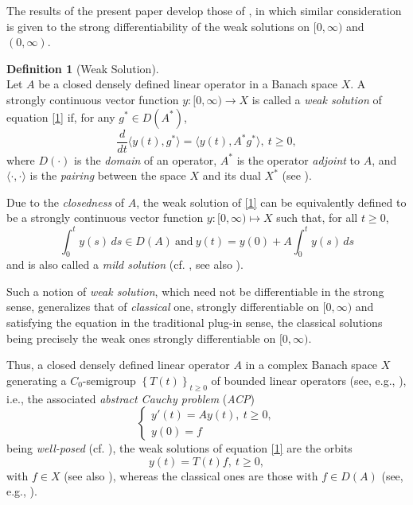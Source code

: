 \documentclass{amsart}
\theoremstyle{plain}
\theoremstyle{definition}
\newtheorem{defn}{Definition}[section]
\begin{document}
The results of the present paper develop those of \cite{Markin2011}, in which similar consideration is given to the strong differentiability of the weak solutions on $[0,\infty)$ and $(0,\infty)$.

\begin{defn}[Weak Solution]\label{ws}\ \\
Let $A$ be a closed densely defined linear operator in a Banach space $X$. A strongly continuous vector function $y:[0,\infty)\rightarrow X$ is called a {\it weak solution} of equation \eqref{1} if, for any $g^* \in D(A^*)$,
\begin{equation*}
\dfrac{d}{dt}\langle y(t),g^*\rangle = \langle y(t),A^*g^* \rangle,\ t\ge 0,
\end{equation*}
where $D(\cdot)$ is the \textit{domain} of an operator, $A^*$ is the operator {\it adjoint} to $A$, and $\langle\cdot,\cdot\rangle$ is the {\it pairing} between
the space $X$ and its dual $X^*$ (see \cite{Ball}).
\end{defn}

Due to the \textit{closedness} of $A$, the weak solution of \eqref{1} can be equivalently defined to be a strongly continuous vector function $y:[0,\infty)\mapsto X$ such that, for all $t\ge 0$,
\begin{equation*}
\int_0^ty(s)\,ds\in D(A)\ \text{and} \ y(t)=y(0)+A\int_0^ty(s)\,ds
\end{equation*}
and is also called a \textit{mild solution} (cf. {\cite[Ch. II, Definition 6.3]{Engel-Nagel}}, see also {\cite[Preliminaries]{Markin2017(2)}}).

Such a notion of \textit{weak solution}, which need not be differentiable in the strong sense, generalizes that of \textit{classical} one, strongly differentiable on $[0,\infty)$ and satisfying the equation in the traditional plug-in sense, the classical solutions being precisely the weak ones strongly differentiable on $[0,\infty)$.

Thus, a closed densely defined linear operator $A$
in a complex Banach space $X$ generating a $C_0$-semigroup $\left\{T(t) \right\}_{t\ge 0}$ of  bounded linear operators (see, e.g., \cite{Hille-Phillips,Engel-Nagel}), i.e., the associated \textit{abstract Cauchy problem} (\textit{ACP})
\begin{equation}\label{ACP}
\begin{cases}
y'(t)=Ay(t),\ t\ge 0,\\
y(0)=f
\end{cases}
\end{equation}
being \textit{well-posed} (cf. {\cite[Ch. II, Definition 6.8]{Engel-Nagel}}), the weak solutions of equation \eqref{1} are the orbits
\begin{equation}\label{semigroup}
y(t)=T(t)f,\ t\ge 0,
\end{equation}
with $f\in X$ {\cite[Ch. II, Proposition 6.4]{Engel-Nagel}} (see also {\cite[Theorem]{Ball}}), whereas the classical ones are those with $f\in D(A)$
(see, e.g., {\cite[Ch. II, Proposition 6.3]{Engel-Nagel}}). 
\end{document}
